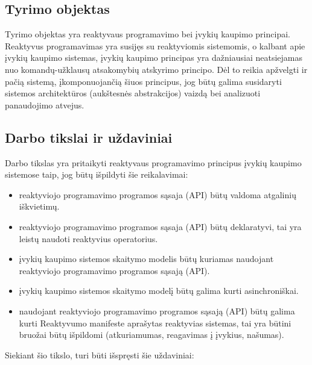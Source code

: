 \subsection{Tyrimo objektas}

    Tyrimo objektas yra reaktyvaus programavimo bei įvykių kaupimo principai. Reaktyvus programavimas yra susijęs su reaktyviomis sistemomis, o kalbant apie įvykių kaupimo sistemas, įvykių kaupimo principas yra dažniausiai neatsiejamas nuo komandų-užklausų atsakomybių atskyrimo principo. Dėl to reikia apžvelgti ir pačią sistemą, įkomponuojančią šiuos principus, jog būtų galima susidaryti sistemos architektūros (aukštesnės abstrakcijos) vaizdą bei analizuoti panaudojimo atvejus.

\subsection{Darbo tikslai ir uždaviniai}

    Darbo tikslas yra pritaikyti reaktyvaus programavimo principus įvykių kaupimo sistemose taip, jog būtų išpildyti šie reikalavimai:

\begin{itemize}

    \item reaktyviojo programavimo programos sąsaja (API) būtų valdoma atgalinių iškvietimų.

    \item reaktyviojo programavimo programos sąsaja (API) būtų deklaratyvi, tai yra leistų naudoti reaktyvius operatorius.

    \item įvykių kaupimo sistemos skaitymo modelis būtų kuriamas naudojant reaktyviojo programavimo programos sąsają (API).

    \item įvykių kaupimo sistemos skaitymo modelį būtų galima kurti asinchroniškai.

    \item naudojant reaktyviojo programavimo programos sąsają (API) būtų galima kurti Reaktyvumo manifeste aprašytas reaktyvias sistemas, tai yra būtini bruožai būtų išpildomi (atkuriamumas, reagavimas į įvykius, našumas).

\end{itemize}

    Siekiant šio tikslo, turi būti išspręsti šie uždaviniai:

